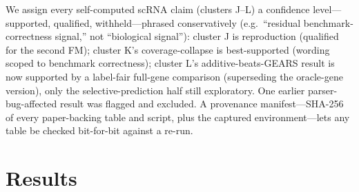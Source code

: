 \documentclass[journal]{IEEEtran}
\begin{document}
We assign every self-computed scRNA claim (clusters J--L) a confidence level---supported, qualified, withheld---phrased conservatively (e.g.\ ``residual benchmark-correctness signal,'' not ``biological signal''): cluster J is reproduction (qualified for the second FM); cluster K's coverage-collapse is best-supported (wording scoped to benchmark correctness); cluster L's additive-beats-GEARS result is now supported by a label-fair full-gene comparison (superseding the oracle-gene version), only the selective-prediction half still exploratory. One earlier parser-bug-affected result was flagged and excluded. A provenance manifest---SHA-256 of every paper-backing table and script, plus the captured environment---lets any table be checked bit-for-bit against a re-run.

\section{Results}
\end{document}
